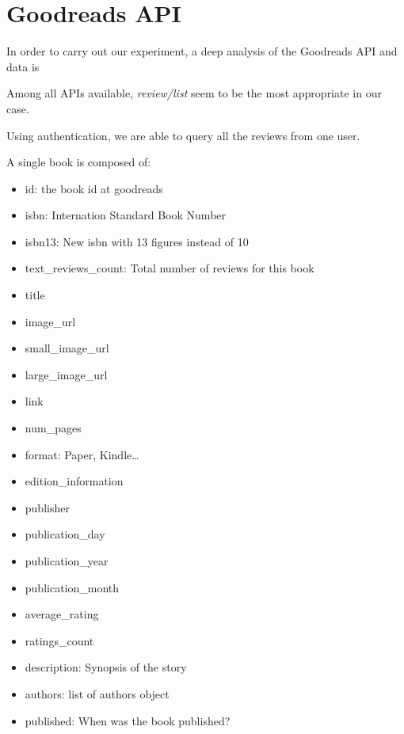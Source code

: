 \section{Goodreads API}

In order to carry out our experiment, a deep analysis of the Goodreads API and data is 

Among all APIs available, \emph{review/list} seem to be the most appropriate in our case.

Using authentication, we are able to query all the reviews from one user.

A single book is composed of:
\begin{itemize}
\item id: the book id at goodreads
\item isbn: Internation Standard Book Number
\item isbn13: New isbn with 13 figures instead of 10
\item text_reviews_count: Total number of reviews for this book
\item title
\item image_url
\item small_image_url
\item large_image_url
\item link
\item num_pages
\item format: Paper, Kindle\dots
\item edition_information
\item publisher
\item publication_day
\item publication_year
\item publication_month
\item average_rating
\item ratings_count
\item description: Synopsis of the story 
\item authors: list of authors object
\item published: When was the book published?
\end{itemize}

